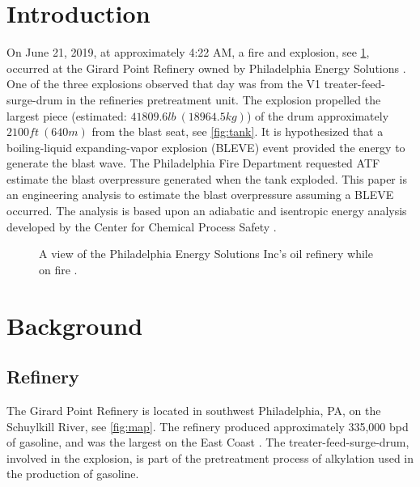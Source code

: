 \documentclass[10pt,parskip=half,
toc=sectionentrywithdots,
bibliography=totocnumbered,
captions=tableheading,numbers=noendperiod]{scrartcl}
\begin{document}
    \begingroup
    \let\cleardoublepage\relax
    \let\clearpage\relax\tableofcontents
    \endgroup

\hypertarget{introduction}{%
\section{Introduction}\label{introduction}}

On June 21, 2019, at approximately 4:22 AM, a fire and explosion, see
\cref{fig:fire}, occurred at the Girard Point Refinery owned by
Philadelphia Energy Solutions \cite{Renshaw2019}. One of the three
explosions observed that day was from the V1 treater-feed-surge-drum in
the refineries pretreatment unit. The explosion propelled the largest
piece (estimated: \(41809.6lb\:(18964.5kg)\)) of the drum approximately
\(2100ft\:(640m)\) from the blast seat, see \cref{fig:tank}. It is
hypothesized that a boiling-liquid expanding-vapor explosion (BLEVE)
event provided the energy to generate the blast wave. The Philadelphia
Fire Department requested ATF estimate the blast overpressure generated
when the tank exploded. This paper is an engineering analysis to
estimate the blast overpressure assuming a BLEVE occurred. The analysis
is based upon an adiabatic and isentropic energy analysis developed by
the Center for Chemical Process Safety \cite{Safety2010}.

\begin{figure}[H]
\hypertarget{fig:fire}{%
\begin{center}
\end{center}
\caption{A view of the Philadelphia Energy Solutions Inc's oil refinery while on
fire \cite{Maykuth2019}.}\label{fig:fire}
}
\end{figure}

\hypertarget{background}{%
\section{Background}\label{background}}

\hypertarget{refinery}{%
\subsection{Refinery}\label{refinery}}

The Girard Point Refinery is located in southwest Philadelphia, PA, on
the Schuylkill River, see \cref{fig:map}. The refinery produced
approximately 335,000 bpd of gasoline, and was the largest on the East
Coast \cite{AssociatedPress2019}. The treater-feed-surge-drum, involved
in the explosion, is part of the pretreatment process of alkylation used
in the production of gasoline.
\end{document}
